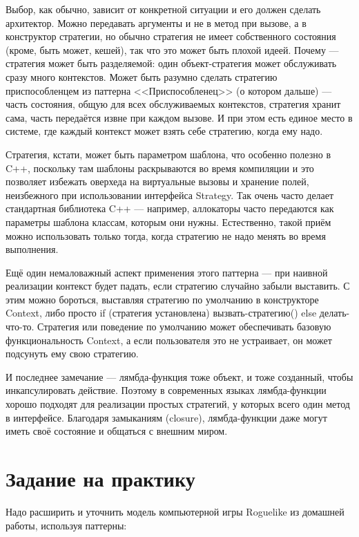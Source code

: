 \documentclass{../../text-style}
\begin{document}
Выбор, как обычно, зависит от конкретной ситуации и его должен сделать архитектор. Можно передавать аргументы и не в метод при вызове, а в конструктор стратегии, но обычно стратегия не имеет собственного состояния (кроме, быть может, кешей), так что это может быть плохой идеей. Почему --- стратегия может быть разделяемой: один объект-стратегия может обслуживать сразу много контекстов. Может быть разумно сделать стратегию приспособленцем из паттерна <<Приспособленец>> (о котором дальше) --- часть состояния, общую для всех обслуживаемых контекстов, стратегия хранит сама, часть передаётся извне при каждом вызове. И при этом есть единое место в системе, где каждый контекст может взять себе стратегию, когда ему надо.

Стратегия, кстати, может быть параметром шаблона, что особенно полезно в C++, поскольку там шаблоны раскрываются во время компиляции и это позволяет избежать оверхеда на виртуальные вызовы и хранение полей, неизбежного при использовании интерфейса Strategy. Так очень часто делает стандартная библиотека C++ --- например, аллокаторы часто передаются как параметры шаблона классам, которым они нужны. Естественно, такой приём можно использовать только тогда, когда стратегию не надо менять во время выполнения.

Ещё один немаловажный аспект применения этого паттерна --- при наивной реализации контекст будет падать, если стратегию случайно забыли выставить. С этим можно бороться, выставляя стратегию по умолчанию в конструкторе Context, либо просто if (стратегия установлена) вызвать-стратегию() else делать-что-то. Стратегия или поведение по умолчанию может обеспечивать базовую функциональность Context, а если пользователя это не устраивает, он может подсунуть ему свою стратегию.

И последнее замечание --- лямбда-функция тоже объект, и тоже созданный, чтобы инкапсулировать действие. Поэтому в современных языках лямбда-функции хорошо подходят для реализации простых стратегий, у которых всего один метод в интерфейсе. Благодаря замыканиям (closure), лямбда-функции даже могут иметь своё состояние и общаться с внешним миром.

\section{Задание на практику}

Надо расширить и уточнить модель компьютерной игры Roguelike из домашней работы, используя паттерны:
\end{document}
